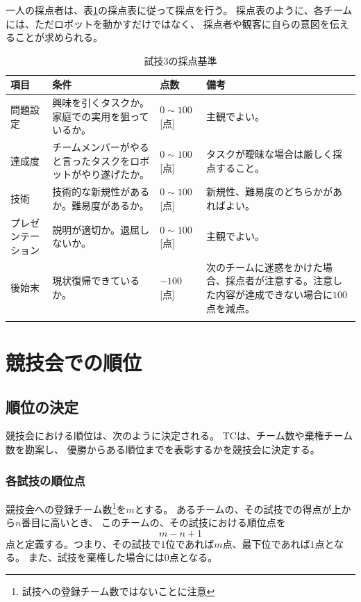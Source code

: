 \documentclass[a4j]{jarticle}
\def\thline{\noalign{\hrule height 1pt}}
\begin{document}
一人の採点者は、表\ref{table:test3score}の採点表に従って採点を行う。
採点表のように、各チームには、ただロボットを動かすだけではなく、
採点者や観客に自らの意図を伝えることが求められる。


\begin{table}
\begin{center}
\caption{試技3の採点基準}
\label{table:test3score}
\begin{tabular}{l|p{4cm}|l|p{4cm}}
\thline
項目 & 条件 & 点数 & 備考\\
\hline
問題設定 & 興味を引くタスクか。家庭での実用を狙っているか。 & $0\sim100$[点] & 主観でよい。\\
\hline
達成度 & チームメンバーがやると言ったタスクをロボットがやり遂げたか。 & $0\sim100$[点] & タスクが曖昧な場合は厳しく採点すること。 \\
\hline
技術 & 技術的な新規性があるか。難易度があるか。 & $0\sim100$[点]  & 新規性、難易度のどちらかがあればよい。\\
\hline
プレゼンテーション & 説明が適切か。退屈しないか。 & $0\sim100$[点] & 主観でよい。\\
\hline
後始末 & 現状復帰できているか。 & $-100$[点] & 次のチームに迷惑をかけた場合、採点者が注意する。注意した内容が達成できない場合に$100$点を減点。\\
\thline
\end{tabular}
\end{center}
\end{table}



\section{競技会での順位}

\subsection{順位の決定}

競技会における順位は、次のように決定される。
TCは、チーム数や棄権チーム数を勘案し、
優勝からある順位までを表彰するかを競技会に決定する。

\subsubsection{各試技の順位点}\label{sub:testrank}

競技会への登録チーム数\footnote{試技への登録チーム数ではないことに注意}を$m$とする。
あるチームの、その試技での得点が上から$n$番目に高いとき、
このチームの、その試技における順位点を
\[
	m - n + 1
\]
点と定義する。つまり、その試技で$1$位であれば$m$点、最下位であれば$1$点となる。
また、試技を棄権した場合には$0$点となる。
\end{document}
